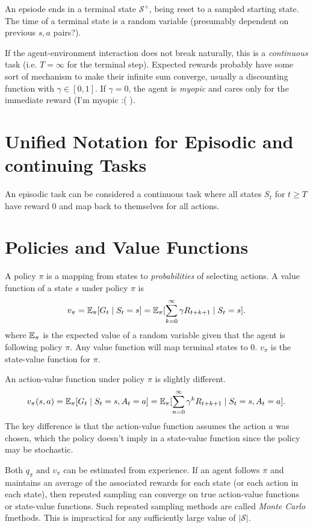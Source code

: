 \documentclass[a4paper]{report}
\begin{document}
An epsiode ends in a terminal state $\mathcal{S}^+$, being reset to a sampled starting state. The time of a terminal state is a random variable (presumably dependent on previous $s,a$ pairs?).

If the agent-environment interaction does not break naturally, this is a \textit{continuous} task (i.e. $T = \infty$ for the terminal step). Expected rewards probably have some sort of mechanism to make their infinite sum converge, usually a discounting function with $\gamma \in [0,1]$. If $\gamma = 0$, the agent is \textit{myopic} and cares only for the immediate reward (I'm myopic :( ).

\section{Unified Notation for Episodic and continuing Tasks}
An episodic task can be considered a continuous task where all states $S_t$ for $t \geq T$ have reward 0 and map back to themselves for all actions.

\section{Policies and Value Functions}
A policy $\pi$ is a mapping from states to \textit{probabilities} of selecting actions. A value function of a state $s$ under policy $\pi$ is
\[
  v_{\pi} = \mathbb{E}_{\pi}[G_t \mid S_t=s] = \mathbb{E}_{\pi}[\sum_{k=0}^{\infty} \gamma R_{t+k+1} \mid S_t=s]
.\] 
where $\mathbb{E}_{\pi}$ is the expected value of a random variable given that the agent is following policy $\pi$. Any value function will map terminal states to 0. $v_{\pi}$ is the state-value function for $\pi$. 

An action-value function under policy $\pi$ is slightly different.
\[
  v_{\pi}(s,a) = \mathbb{E}_{\pi}[G_t \mid S_t=s, A_t=a] \\
  = \mathbb{E}_{\pi}[\sum_{n=0}^{\infty} \gamma^k R_{t+k+1} \mid S_t=s, A_t=a]
.\] 
The key difference is that the action-value function assumes the action $a$ was chosen, which the policy doesn't imply in a state-value function since the policy may be stochastic.

Both $q_{\pi} \text{ and } v_{\pi}$ can be estimated from experience. If an agent follows $\pi$ and maintains an average of the associated rewards for each state (or each action in each state), then repeated sampling can converge on true action-value functions or state-value functions. Such repeated sampling methods are called \textit{Monte Carlo} fmethods. This is impractical for any sufficiently large value of $|\mathcal{S}|$.
\end{document}
